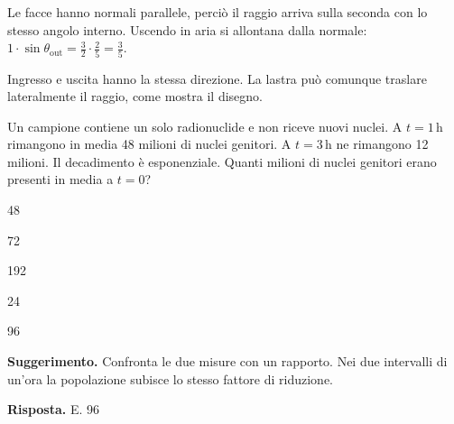 \documentclass[11pt,a4paper]{article}
\begin{document}
\begin{samepage}
Le facce hanno normali parallele, perciò il raggio arriva sulla seconda con lo stesso angolo interno. Uscendo in aria si allontana dalla normale: \(1\cdot\sin\theta_\mathrm{out}=\frac{3}{2}\cdot\frac{2}{5}=\frac{3}{5}\).\par

Ingresso e uscita hanno la stessa direzione. La lastra può comunque traslare lateralmente il raggio, come mostra il disegno.\par

\end{samepage}
\newpage
\begin{samepage}
\par\smallskip
Un campione contiene un solo radionuclide e non riceve nuovi nuclei. A \(t=1\,\mathrm{h}\) rimangono in media 48 milioni di nuclei genitori. A \(t=3\,\mathrm{h}\) ne rimangono 12 milioni. Il decadimento è esponenziale. Quanti milioni di nuclei genitori erano presenti in media a \(t=0\)?\par


\begin{list}{}{\setlength{\leftmargin}{1.4em}\setlength{\itemsep}{.1em}\setlength{\parsep}{0pt}}\small
\item[A.] 48
\item[B.] 72
\item[C.] 192
\item[D.] 24
\item[E.] 96
\end{list}
{\small\textbf{Suggerimento.} Confronta le due misure con un rapporto. Nei due intervalli di un’ora la popolazione subisce lo stesso fattore di riduzione.\par}
\medskip\noindent\textbf{Risposta.} E. 96\par


\end{samepage}
\end{document}
